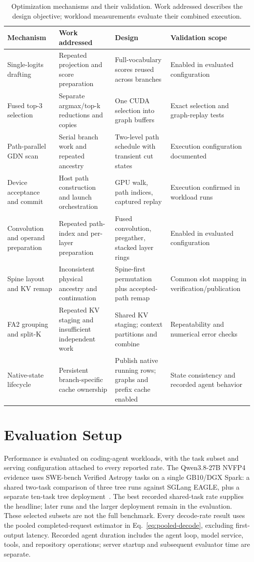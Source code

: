 \documentclass[conference]{IEEEtran}
\begin{document}
\begin{table}[t]
\caption{Optimization mechanisms and their validation. Work addressed describes the design objective; workload measurements evaluate their combined execution.}
\label{tab:optimization-map}
\centering\footnotesize
\begin{tabularx}{\textwidth}{@{}p{}YYY@{}}
\toprule
Mechanism & Work addressed & Design & Validation scope \\
\midrule
Single-logits drafting & Repeated projection and score preparation & Full-vocabulary scores reused across branches & Enabled in evaluated configuration \\
Fused top-3 selection & Separate argmax/top-k reductions and copies & One CUDA selection into graph buffers & Exact selection and graph-replay tests \\
Path-parallel GDN scan & Serial branch work and repeated ancestry & Two-level path schedule with transient cut states & Execution configuration documented \\
Device acceptance and commit & Host path construction and launch orchestration & GPU walk, path indices, captured replay & Execution confirmed in workload runs \\
Convolution and operand preparation & Repeated path-index and per-layer preparation & Fused convolution, pregather, stacked layer rings & Enabled in evaluated configuration \\
Spine layout and KV remap & Inconsistent physical ancestry and continuation & Spine-first permutation plus accepted-path remap & Common slot mapping in verification/publication \\
FA2 grouping and split-K & Repeated KV staging and insufficient independent work & Shared KV staging; context partitions and combine & Repeatability and numerical error checks \\
Native-state lifecycle & Persistent branch-specific cache ownership & Publish native running rows; graphs and prefix cache enabled & State consistency and recorded agent behavior \\
\bottomrule
\end{tabularx}
\end{table}

\section{Evaluation Setup}
\label{sec:protocol}
Performance is evaluated on coding-agent workloads, with the task subset and serving configuration attached to every reported rate. The Qwen3.8-27B NVFP4 evidence uses SWE-bench Verified Astropy tasks on a single GB10/DGX Spark: a shared two-task comparison of three tree runs against SGLang EAGLE, plus a separate ten-task tree deployment~\cite{lumo2026archive,jimenez2024swe}. The best recorded shared-task rate supplies the headline; later runs and the larger deployment remain in the evaluation. These selected subsets are not the full benchmark. Every decode-rate result uses the pooled completed-request estimator in Eq.~\ref{eq:pooled-decode}, excluding first-output latency. Recorded agent duration includes the agent loop, model service, tools, and repository operations; server startup and subsequent evaluator time are separate.
\end{document}
